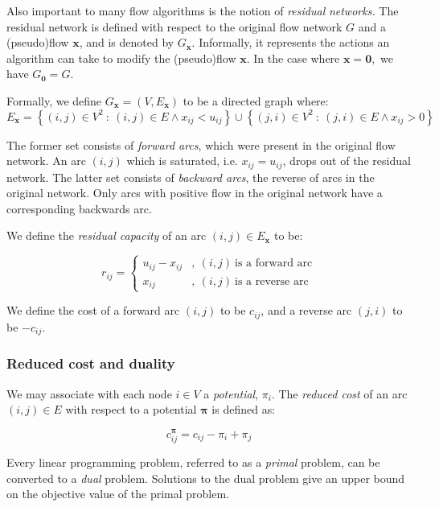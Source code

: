 Also important to many flow algorithms is the notion of \emph{residual}
\emph{networks. }The residual network is defined with respect to the
original flow network $G$ and a (pseudo)flow $\mathbf{x}$, and is
denoted by $G_{\mathbf{x}}$. Informally, it represents the actions
an algorithm can take to modify the (pseudo)flow $\mathbf{x}$. In
the case where $\mathbf{x=0},$ we have $G_{\mathbf{0}}=G$.

Formally, we define $G_{\mathbf{x}}=\left(V,E_{\mathbf{x}}\right)$
to be a directed graph where:
\begin{equation}
E_{\mathbf{x}}=\left\{ (i,j)\in V^{2}\::\:(i,j)\in E\land x_{ij}<u_{ij}\right\} \cup\left\{ (j,i)\in V^{2}\::\:(j,i)\in E\land x_{ij}>0\right\} 
\end{equation}


The former set consists of \emph{forward arcs}, which were present
in the original flow network. An arc $(i,j)$ which is saturated,
i.e. $x_{ij}=u_{ij}$, drops out of the residual network. The latter
set consists of \emph{backward arcs}, the reverse of arcs in the original
network. Only arcs with positive flow in the original network have
a corresponding backwards arc.

We define the \emph{residual capacity} of an arc $(i,j)\in E_{\mathbf{x}}$
to be:

\begin{equation}
r_{ij}=\begin{cases}
u_{ij}-x_{ij} & ,\:(i,j)\:\mbox{is a forward arc}\\
x_{ij} & ,\:(i,j)\:\mbox{is a reverse arc}
\end{cases}
\end{equation}

We define the cost of a forward arc $(i,j)$ to be $c_{ij}$, and
a reverse arc $(j,i)$ to be $-c_{ij}$.


\subsubsection{Reduced cost and duality}

We may associate with each node $i\in V$ a \emph{potential}, $\pi_{i}$.
The \emph{reduced cost} of an arc $(i,j)\in E$ with respect to a
potential $\boldsymbol{\pi}$ is defined as:

\begin{equation}
c_{ij}^{\boldsymbol{\pi}}=c_{ij}-\pi_{i}+\pi_{j}
\end{equation}


Every linear programming problem, referred to as a \emph{primal} problem,
can be converted to a \emph{dual} problem. Solutions to the dual problem
give an upper bound on the objective value of the primal problem.

